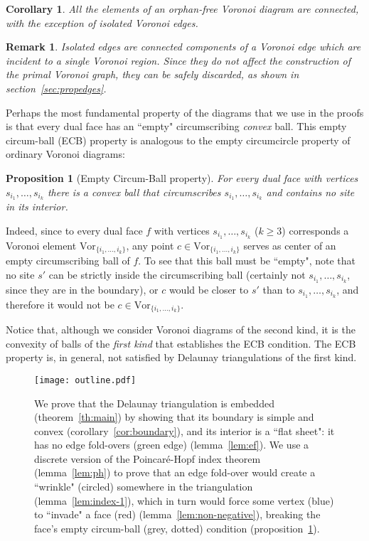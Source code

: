 \documentclass[11pt]{article}
\newtheorem{proposition}{Proposition}
\newtheorem{remark}{Remark}
\newtheorem{corollary}{Corollary}
\newcommand{\Vor}{\text{Vor}}
\begin{document}
\begin{corollary}\label{cor:VorI}
	All the elements of an orphan-free Voronoi diagram are connected, 
	with the exception of isolated Voronoi edges. 
\end{corollary}
\begin{remark}
	Isolated edges are connected components of a Voronoi edge 
	which are incident to a single Voronoi region. 
	Since they do not affect the construction of the primal Voronoi graph, 
they can be safely discarded, as shown in section~\ref{sec:propedges}.
\end{remark}

Perhaps the most fundamental property of the diagrams that we use in the proofs is that 
	every dual face has an ``empty" circumscribing \emph{convex} ball. 
This empty circum-ball (ECB) property
	is analogous to the empty circumcircle property of ordinary Voronoi diagrams:
\begin{proposition}[Empty Circum-Ball property]\label{prop:ECB}
	For every dual face with vertices $s_{i_1},\dots,s_{i_k}$ there is a convex ball that circumscribes $s_{i_1},\dots,s_{i_k}$ and contains no site in its interior. 
\end{proposition}

Indeed, since to every dual face $f$ with vertices $s_{i_1},\dots,s_{i_k}$ ($k\ge 3$) corresponds 
	a Voronoi element $\Vor_{\{i_1,\dots,i_k\}}$, 
	any point $c\in\Vor_{\{i_1,\dots,i_k\}}$ serves as center of an empty circumscribing ball of $f$. 
To see that this ball must be ``empty", note that 
no site $s'$ can be strictly inside the circumscribing ball (certainly not $s_{i_1},\dots,s_{i_k}$, since they are in the boundary), 
	or $c$ would be closer to $s'$ than to $s_{i_1},\dots,s_{i_k}$, 
	and therefore it would not be $c\in\Vor_{\{i_1,\dots,i_k\}}$. 

Notice that, although we consider Voronoi diagrams of the second kind, 
	it is the convexity of balls of the \emph{first kind} that establishes the ECB condition. 
The ECB property is, in general, not satisfied by Delaunay triangulations of the first kind. 

\begin{figure}[htbp]
\begin{center}
\texttt{[image: outline.pdf]}
\caption{
	We prove that the Delaunay triangulation is embedded (theorem~\ref{th:main}) 
	by showing that its boundary is simple and convex (corollary~\ref{cor:boundary}), 
		and its interior is a ``flat sheet": it has no edge fold-overs (green edge) (lemma~\ref{lem:ef}).  
	We use a discrete version of the Poincar\'e-Hopf index theorem (lemma~\ref{lem:ph}) to prove that  
		an edge fold-over would create a ``wrinkle" (circled) somewhere in the triangulation (lemma~\ref{lem:index-1}), 
		which in turn would force some vertex (blue) to ``invade" a face (red) (lemma~\ref{lem:non-negative}), 
		breaking the face's empty circum-ball (grey, dotted) condition (proposition~\ref{prop:ECB}).}
\label{fig:outline}
\end{center}
\end{figure}
\end{document}

